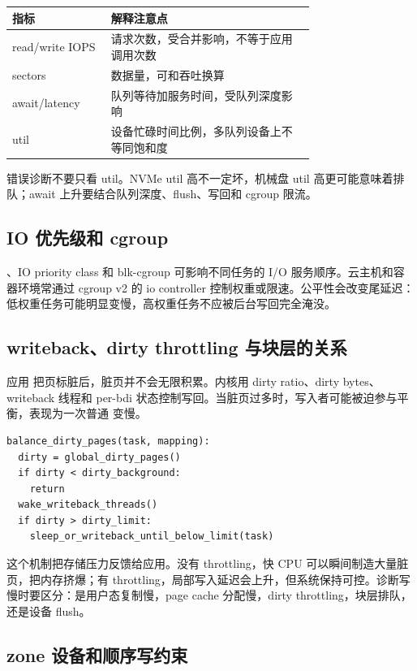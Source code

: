 \begin{longtable}{|p{0.22\linewidth}|p{0.52\linewidth}|}
\toprule
指标 & 解释注意点 \\
\midrule
read/write IOPS & 请求次数，受合并影响，不等于应用调用次数 \\\tablerowrule
sectors & 数据量，可和吞吐换算 \\\tablerowrule
await/latency & 队列等待加服务时间，受队列深度影响 \\\tablerowrule
util & 设备忙碌时间比例，多队列设备上不等同饱和度 \\
\bottomrule
\end{longtable}

错误诊断不要只看 util。NVMe util 高不一定坏，机械盘 util 高更可能意味着排队；await 上升要结合队列深度、flush、写回和 cgroup 限流。

\subsection{IO 优先级和 cgroup}

、IO priority class 和 blk-cgroup 可影响不同任务的 I/O 服务顺序。云主机和容器环境常通过 cgroup v2 的 io controller 控制权重或限速。公平性会改变尾延迟：低权重任务可能明显变慢，高权重任务不应被后台写回完全淹没。

\subsection{writeback、dirty throttling 与块层的关系}

应用  把页标脏后，脏页并不会无限积累。内核用 dirty ratio、dirty bytes、writeback 线程和 per-bdi 状态控制写回。当脏页过多时，写入者可能被迫参与平衡，表现为一次普通  变慢。

\begin{lstlisting}
balance_dirty_pages(task, mapping):
  dirty = global_dirty_pages()
  if dirty < dirty_background:
    return
  wake_writeback_threads()
  if dirty > dirty_limit:
    sleep_or_writeback_until_below_limit(task)
\end{lstlisting}

这个机制把存储压力反馈给应用。没有 throttling，快 CPU 可以瞬间制造大量脏页，把内存挤爆；有 throttling，局部写入延迟会上升，但系统保持可控。诊断写慢时要区分：是用户态复制慢，page cache 分配慢，dirty throttling，块层排队，还是设备 flush。

\subsection{zone 设备和顺序写约束}

